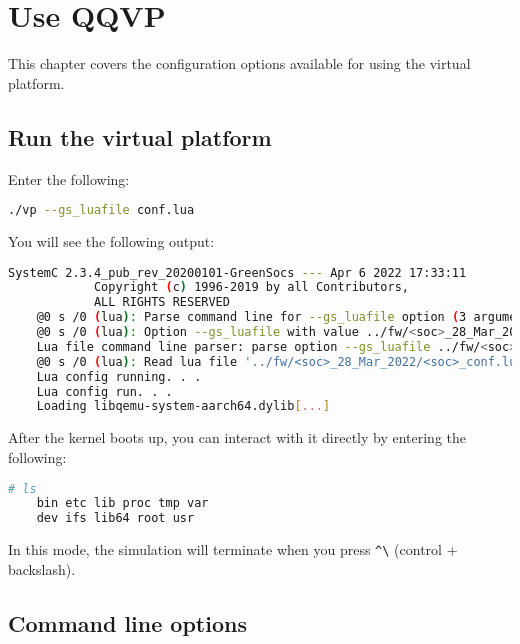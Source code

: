 \chapter{Use QQVP}

This chapter covers the configuration options available for using the virtual platform.


\section{Run the virtual platform}

Enter the following:

\small
\begin{lstlisting}[language=bash]
    ./vp --gs_luafile conf.lua
\end{lstlisting}
\normalsize

You will see the following output:

\small
\begin{lstlisting}[language=bash]
            SystemC 2.3.4_pub_rev_20200101-GreenSocs --- Apr 6 2022 17:33:11
            Copyright (c) 1996-2019 by all Contributors,
            ALL RIGHTS RESERVED
    @0 s /0 (lua): Parse command line for --gs_luafile option (3 arguments)
    @0 s /0 (lua): Option --gs_luafile with value ../fw/<soc>_28_Mar_2022/<soc>_conf.lua
    Lua file command line parser: parse option --gs_luafile ../fw/<soc>_28_Mar_2022/<soc>_conf.lua
    @0 s /0 (lua): Read lua file '../fw/<soc>_28_Mar_2022/<soc>_conf.lua'
    Lua config running. . .
    Lua config run. . .
    Loading libqemu-system-aarch64.dylib[...]
\end{lstlisting}
\normalsize


After the kernel boots up, you can interact with it directly by entering the following:

\small
\begin{lstlisting}[language=bash]
    # ls
    bin etc lib proc tmp var
    dev ifs lib64 root usr
\end{lstlisting}
\normalsize

\note In this mode, the simulation will terminate when you press {\small{\lstinline!^\!}} (control + backslash).


\clearpage
\section{Command line options}

